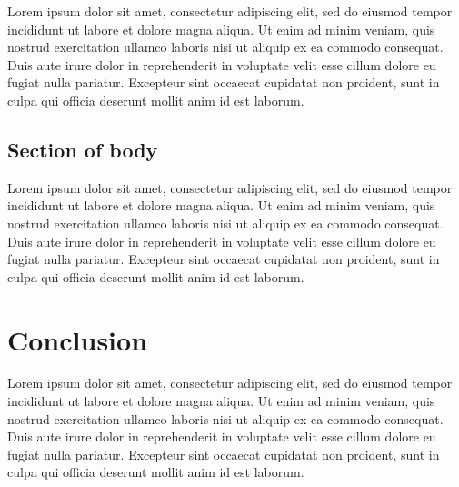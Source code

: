\documentclass[openany]{brandeis-dissertation3.15}
\begin{document}
Lorem ipsum dolor sit amet, consectetur adipiscing elit, sed do eiusmod tempor incididunt ut labore et dolore magna aliqua. Ut enim ad minim veniam, quis nostrud exercitation ullamco laboris nisi ut aliquip ex ea commodo consequat. Duis aute irure dolor in reprehenderit in voluptate velit esse cillum dolore eu fugiat nulla pariatur. Excepteur sint occaecat cupidatat non proident, sunt in culpa qui officia deserunt mollit anim id est laborum.

\section{Section of body}
Lorem ipsum dolor sit amet, consectetur adipiscing elit, sed do eiusmod tempor incididunt ut labore et dolore magna aliqua. Ut enim ad minim veniam, quis nostrud exercitation ullamco laboris nisi ut aliquip ex ea commodo consequat. Duis aute irure dolor in reprehenderit in voluptate velit esse cillum dolore eu fugiat nulla pariatur. Excepteur sint occaecat cupidatat non proident, sunt in culpa qui officia deserunt mollit anim id est laborum.

\chapter{Conclusion}
Lorem ipsum dolor sit amet, consectetur adipiscing elit, sed do eiusmod tempor incididunt ut labore et dolore magna aliqua. Ut enim ad minim veniam, quis nostrud exercitation ullamco laboris nisi ut aliquip ex ea commodo consequat. Duis aute irure dolor in reprehenderit in voluptate velit esse cillum dolore eu fugiat nulla pariatur. Excepteur sint occaecat cupidatat non proident, sunt in culpa qui officia deserunt mollit anim id est laborum.
\end{document}
